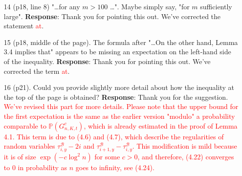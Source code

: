 \documentclass[11pt,a4paper]{article}
\numberwithin{equation}{section}
\def\TBF#1{\textcolor{red}{#1}} %
\begin{document}
\begin{itemize}
		
		\item [14] (p18, line 8) "\dots for any $m > 100$ \dots ". Maybe simply say, "for $m$ sufficiently large".
		\subitem \textbf{Response}:  Thank you for pointing this out.  We've corrected the statement \TBF{at}.
		
		
		
		\item [15] (p18, middle of the page). The formula after "\dots On the other hand, Lemma 3.4 implies that" appears to be missing an expectation on the left-hand side of the inequality.
		\subitem \textbf{Response}:  Thank you for pointing this out. We've corrected the term \TBF{at}.
		
		\item [16] (p21). Could you provide slightly more detail about how the inequality at the top of the page is obtained?
		\subitem \textbf{Response}: Thank you for the suggestion. \TBF{We've revised this part for more details. Please note that the upper bound for the first expectation is the same as the earlier version "modulo" a probability comparable to $\mathbb{P}(G^c_{n,K,t}) $, which is already estimated in the proof of Lemma 4.1. This term is due to (4.6) and (4.7), which describe the regularities of random variables $\tau^{\mathcal{B}}_{i,y}-2i $ and $\tau^{\mathcal{B}}_{i+1,y}- \tau^{\mathcal{B}}_{i,y}$. This modification is mild because it is of size $\exp(- c \log^2 n) $ for some $c>0$, and therefore, (4.22) converges to $0$ in probability as $n$ goes to infinity, see (4.24).}
		
		
	\end{itemize}
\end{document}

